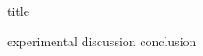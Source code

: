 \documentclass[12pt,a4paper]{article}
\begin{document}
{title}

{experimental}
{discussion}
{conclusion}

\clearpage




\lstlistoflistings
\end{document}
